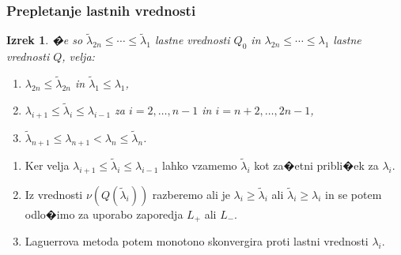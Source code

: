 \documentclass[9pt]{beamer}
\newtheorem{izrek}{Izrek}
\begin{document}
\begin{frame}
\frametitle{Prepletanje lastnih vrednosti}

\begin{izrek}
  �e so $\widetilde{\lambda}_{2n}\le \cdots \le \widetilde{\lambda}_1$
  lastne vrednosti
  $Q_0$ in $\lambda_{2n}\le\cdots\le \lambda_1$ lastne vrednosti
  $Q$,
  velja:
  \begin{enumerate}
    \item [a)] $\lambda_{2n}\le \widetilde{\lambda}_{2n}$ in
               $\widetilde{\lambda}_1\le \lambda_1$,
    \item [b)] $\lambda_{i+1}\le \widetilde{\lambda}_{i}\le \lambda_{i-1}$ za
               $i=2,\ldots,n-1$ in $i=n+2,\ldots,2n-1$,
    \item[c)]  $\widetilde{\lambda}_{n+1}\le \lambda_{n+1}
              <\lambda_n\le \widetilde{\lambda}_{n}$.
    \end{enumerate}
\label{preplet}
\end{izrek}\vspace{1em}\pause

\begin{enumerate}
\item Ker velja $\lambda_{i+1}\le \widetilde{\lambda}_{i}\le \lambda_{i-1}$
lahko vzamemo $\widetilde{\lambda}_i$ kot za�etni pribli�ek za
$\lambda_i$.\vspace{1em} \pause
\item Iz vrednosti $\nu(Q(\widetilde{\lambda}_i))$  razberemo
ali je $\lambda_i\ge\widetilde{\lambda}_i$ ali
$\widetilde{\lambda}_i\ge\lambda_i$ in se potem odlo�imo za uporabo
zaporedja $L_{+}$ ali $L_{-}$.\vspace{1em} \pause
\item Laguerrova metoda potem \alert{monotono skonvergira}
proti lastni vrednosti $\lambda_i$.
\end{enumerate}
\end{frame}
\end{document}
